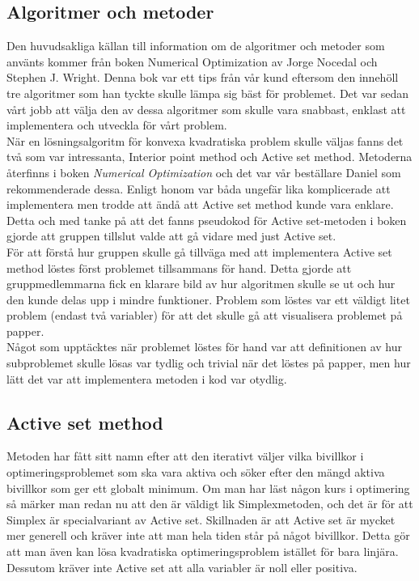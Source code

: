 \subsection{Algoritmer och metoder}
Den huvudsakliga källan till information om de algoritmer och metoder som använts kommer från boken Numerical Optimization av Jorge Nocedal och Stephen J. Wright. Denna bok var ett tips från vår kund eftersom den innehöll tre algoritmer som han tyckte skulle lämpa sig bäst för problemet. Det var sedan vårt jobb att välja den av dessa algoritmer som skulle vara snabbast, enklast att implementera och utveckla för vårt problem.
\\
När en lösningsalgoritm för konvexa kvadratiska problem skulle väljas fanns det två som var intressanta, Interior point method och Active set method. Metoderna återfinns i boken \emph{Numerical Optimization} och det var vår beställare Daniel som rekommenderade dessa. Enligt honom var båda ungefär lika komplicerade att implementera men trodde att ändå att Active set method kunde vara enklare. Detta och med tanke på att det fanns pseudokod för Active set-metoden i boken gjorde att gruppen tillslut valde att gå vidare med just Active set. 
\\
För att förstå hur gruppen skulle gå tillväga med att implementera Active set method löstes först problemet tillsammans för hand. Detta gjorde att gruppmedlemmarna fick en klarare bild av hur algoritmen skulle se ut och hur den kunde delas upp i mindre funktioner. Problem som löstes var ett väldigt litet problem (endast två variabler) för att det skulle gå att visualisera problemet på papper. \\
Något som upptäcktes när problemet löstes för hand var att definitionen av hur subproblemet skulle lösas var tydlig och trivial när det löstes på papper, men hur lätt det var att implementera metoden i kod var otydlig. 

\subsection{Active set method}   
Metoden har fått sitt namn efter att den iterativt väljer vilka bivillkor i optimeringsproblemet som ska vara aktiva och söker efter den mängd aktiva bivillkor som ger ett globalt minimum. Om man har läst någon kurs i optimering så märker man redan nu att den är väldigt lik Simplexmetoden, och det är för att Simplex är specialvariant av Active set. Skillnaden är att Active set är mycket mer generell och kräver inte att man hela tiden står på något bivillkor. Detta gör att man även kan lösa kvadratiska optimeringsproblem istället för bara linjära. Dessutom kräver inte Active set att alla variabler är noll eller positiva.


